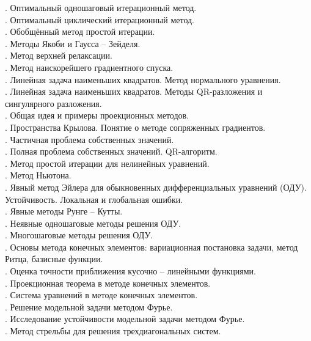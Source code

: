 \documentclass[specialist, subf, href, colorlinks=true, 12pt, times, mtpro, final]{disser}
\theoremstyle{definition}
\begin{document}
{. Оптимальный одношаговый итерационный метод.\\
. Оптимальный циклический итерационный метод.\\
. Обобщённый метод простой итерации.\\
. Методы Якоби и Гаусса -- Зейделя.\\
. Метод верхней релаксации.\\
. Метод наискорейшего градиентного спуска.\\
. Линейная задача наименьших квадратов. Метод нормального уравнения.\\
. Линейная задача наименьших квадратов. Методы QR-разложения и сингулярного разложения.\\
. Общая идея и примеры проекционных методов.\\
. Пространства Крылова. Понятие о методе сопряженных градиентов.\\
. Частичная проблема собственных значений.\\
. Полная проблема собственных значений. QR-алгоритм.\\
. Метод простой итерации для нелинейных уравнений.\\
. Метод Ньютона.\\
. Явный метод Эйлера для обыкновенных дифференциальных уравнений (ОДУ). Устойчивость. Локальная и глобальная ошибки.\\
. Явные методы Рунге -- Кутты.\\
. Неявные одношаговые методы решения ОДУ.\\
. Многошаговые методы решения ОДУ.\\
. Основы метода конечных элементов: вариационная постановка задачи, метод Ритца, базисные функции.\\
. Оценка точности приближения кусочно -- линейными функциями.\\
. Проекционная теорема в методе конечных элементов.\\
. Система уравнений в методе конечных элементов.\\
. Решение модельной задачи методом Фурье.\\
. Исследование устойчивости модельной задачи методом Фурье.\\
. Метод стрельбы для решения трехдиагональных систем.\\
}
\end{document}
